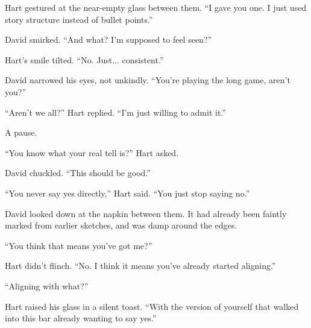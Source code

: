 Hart gestured at the near-empty glass between them. ``I gave you one. I just used story structure instead of 
bullet points.''

David smirked. ``And what? I’m supposed to feel seen?''

Hart’s smile tilted. ``No. Just... consistent.''

David narrowed his eyes, not unkindly. ``You’re playing the long game, aren’t you?''

``Aren’t we all?'' Hart replied. ``I’m just willing to admit it.''

A pause. 

``You know what your real tell is?'' Hart asked.

David chuckled. ``This should be good.''

``You never say yes directly,'' Hart said. ``You just stop saying no.''

David looked down at the napkin between them. It had already been faintly marked from earlier sketches, and 
was damp around the edges.

``You think that means you’ve got me?''

Hart didn’t flinch. ``No. I think it means you’ve already started aligning.''

``Aligning with what?''

Hart raised his glass in a silent toast. ``With the version of yourself that walked into this bar already wanting to say yes.''

\medskip

